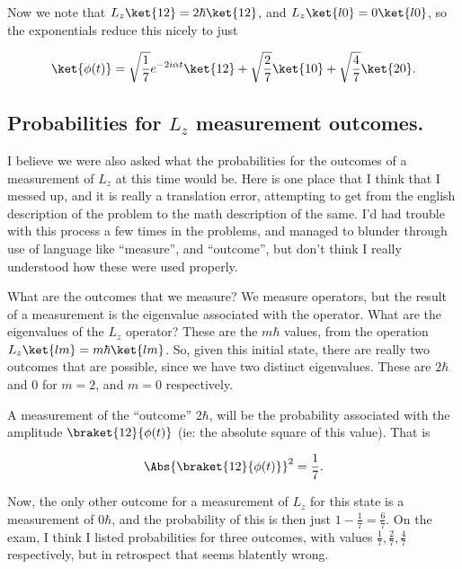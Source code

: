 Now we note that $L_z \ket{12} = 2 \hbar \ket{12}$, and $L_z \ket{ l 0} = 0 \ket{l 0}$, so the exponentials reduce this nicely to just

\begin{equation}\label{eqn:qmIexam2010:40}
\ket{\phi(t)} = 
\sqrt{\frac{1}{7}} e^{ -2 i \alpha t } \ket{ 12 }
+\sqrt{\frac{2}{7}} \ket{ 10 }
+\sqrt{\frac{4}{7}} \ket{ 20 }.
\end{equation}

\subsection{Probabilities for $L_z$ measurement outcomes.}

I believe we were also asked what the probabilities for the outcomes of a measurement of $L_z$ at this time would be.  Here is one place that I think that I messed up, and it is really a translation error, attempting to get from the english description of the problem to the math description of the same.  I'd had trouble with this process a few times in the problems, and managed to blunder through use of language like ``measure'', and ``outcome'', but don't think I really understood how these were used properly.

What are the outcomes that we measure?  We measure operators, but the result of a measurement is the eigenvalue associated with the operator.  What are the eigenvalues of the $L_z$ operator?  These are the $m \hbar$ values, from the operation $L_z \ket{l m} = m \hbar \ket{l m}$.  So, given this initial state, there are really two outcomes that are possible, since we have two distinct eigenvalues.  These are $2 \hbar$ and $0$ for $m = 2$, and $m= 0$ respectively.

A measurement of the ``outcome'' $2 \hbar$, will be the probability associated with the amplitude $\braket{ 1 2 }{\phi(t)}$ (ie: the absolute square of this value).  That is

\begin{equation}\label{eqn:qmIexam2010:50}
\Abs{ \braket{ 1 2 }{\phi(t) } }^2 = \frac{1}{7}.
\end{equation}

Now, the only other outcome for a measurement of $L_z$ for this state is a measurement of $0 \hbar$, and the probability of this is then just $1 - \frac{1}{7} = \frac{6}{7}$.  On the exam, I think I listed probabilities for three outcomes, with values $\frac{1}{7}, \frac{2}{7}, \frac{4}{7}$ respectively, but in retrospect that seems blatently wrong.

